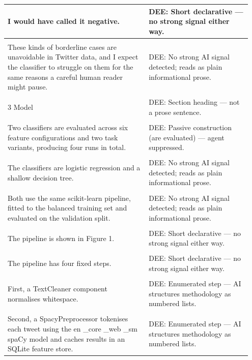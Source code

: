 \documentclass[11pt]{article}
\begin{document}
\begin{longtable}{|p{0.55\linewidth}|p{0.40\linewidth}|}
\hline
I would have called it negative. & DEE: Short declarative --- no strong signal either way. \\[2pt]
\hline
\rule{0pt}{3.5cm} & \\
\hline
These kinds of borderline cases are unavoidable in Twitter data, and I expect the classifier to struggle on them for the same reasons a careful human reader might pause. & DEE: No strong AI signal detected; reads as plain informational prose. \\[2pt]
\hline
\rule{0pt}{3.5cm} & \\
\hline
3 Model & DEE: Section heading --- not a prose sentence. \\[2pt]
\hline
\rule{0pt}{3.5cm} & \\
\hline
Two classifiers are evaluated across six feature configurations and two task variants, producing four runs in total. & DEE: Passive construction (are evaluated) --- agent suppressed. \\[2pt]
\hline
\rule{0pt}{3.5cm} & \\
\hline
The classifiers are logistic regression and a shallow decision tree. & DEE: No strong AI signal detected; reads as plain informational prose. \\[2pt]
\hline
\rule{0pt}{3.5cm} & \\
\hline
Both use the same scikit-learn pipeline, fitted to the balanced training set and evaluated on the validation split. & DEE: No strong AI signal detected; reads as plain informational prose. \\[2pt]
\hline
\rule{0pt}{3.5cm} & \\
\hline
The pipeline is shown in Figure 1. & DEE: Short declarative --- no strong signal either way. \\[2pt]
\hline
\rule{0pt}{3.5cm} & \\
\hline
The pipeline has four fixed steps. & DEE: Short declarative --- no strong signal either way. \\[2pt]
\hline
\rule{0pt}{3.5cm} & \\
\hline
First, a TextCleaner component normalises whitespace. & DEE: Enumerated step --- AI structures methodology as numbered lists. \\[2pt]
\hline
\rule{0pt}{3.5cm} & \\
\hline
Second, a SpacyPreprocessor tokenises each tweet using the en \_core \_web \_sm spaCy model and caches results in an SQLite feature store. & DEE: Enumerated step --- AI structures methodology as numbered lists. \\[2pt]

\end{longtable}
\end{document}
